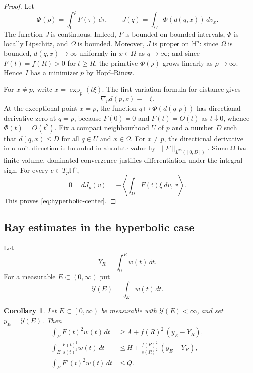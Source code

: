 \documentclass[10pt,a4paper]{amsart}
\newtheorem{corollary}[theorem]{Corollary}
\newcommand{\HH}{\mathbb H}
\begin{document}
\begin{proof}
Let
$$
        \Phi(\rho)=\int_0^\rho F(\tau)\,d\tau,
        \qquad
        J(q)=\int_\Omega \Phi(d(q,x))\,dv_x.
$$
The function $J$ is continuous.  Indeed, $F$ is bounded on bounded intervals, $\Phi$ is locally Lipschitz, and $\Omega$ is bounded.  Moreover, $J$ is proper on $\HH^n$: since $\Omega$ is bounded, $d(q,x)\to\infty$ uniformly in $x\in\Omega$ as $q\to\infty$; and since $F(t)=f(R)>0$ for $t\ge R$, the primitive $\Phi(\rho)$ grows linearly as $\rho\to\infty$.  Hence $J$ has a minimizer $p$ by Hopf--Rinow.

For $x\ne p$, write $x=\exp_p(t\xi)$.  The first variation formula for distance gives
$$
        \nabla_p d(p,x)=-\xi.
$$
At the exceptional point $x=p$, the function $q\mapsto \Phi(d(q,p))$ has directional derivative zero at $q=p$, because $F(0)=0$ and $F(t)=O(t)$ as $t\downarrow0$, whence $\Phi(t)=O(t^2)$.  Fix a compact neighbourhood $U$ of $p$ and a number $D$ such that $d(q,x)\le D$ for all $q\in U$ and $x\in\Omega$.  For $x\ne p$, the directional derivative in a unit direction is bounded in absolute value by $\|F\|_{L^\infty([0,D])}$.  Since $\Omega$ has finite volume, dominated convergence justifies differentiation under the integral sign.  For every $v\in T_p\HH^n$,
$$
        0=dJ_p(v)=-\left\langle \int_\Omega F(t)\xi\,dv,\,v\right\rangle.
$$
This proves \eqref{eq:hyperbolic-center}.
\end{proof}

\subsection{Ray estimates in the hyperbolic case}

Let
\begin{equation}\label{eq:hyperbolic-Y-R-def}
        Y_R=\int_0^R w(t)\,dt.
\end{equation}
For a measurable $E\subset(0,\infty)$ put
$$
        \mathcal Y(E)=\int_Ew(t)\,dt.
$$

\begin{corollary}\label{cor:hyperbolic-ray-scalar}
Let $E\subset(0,\infty)$ be measurable with $\mathcal Y(E)<\infty$, and set $y_E=\mathcal Y(E)$.  Then
\begin{align}
        \int_E F(t)^2w(t)\,dt
        &\ge A+f(R)^2\,(y_E-Y_R),
        \label{eq:hyperbolic-mass-ray}\\
        \int_E \frac{F(t)^2}{s(t)^2}w(t)\,dt
        &\le H+\frac{f(R)^2}{s(R)^2}\,(y_E-Y_R),
        \label{eq:hyperbolic-angular-ray}\\
        \int_E F'(t)^2w(t)\,dt
        &\le Q.
        \label{eq:hyperbolic-radial-ray}
\end{align}
\end{corollary}
\end{document}
